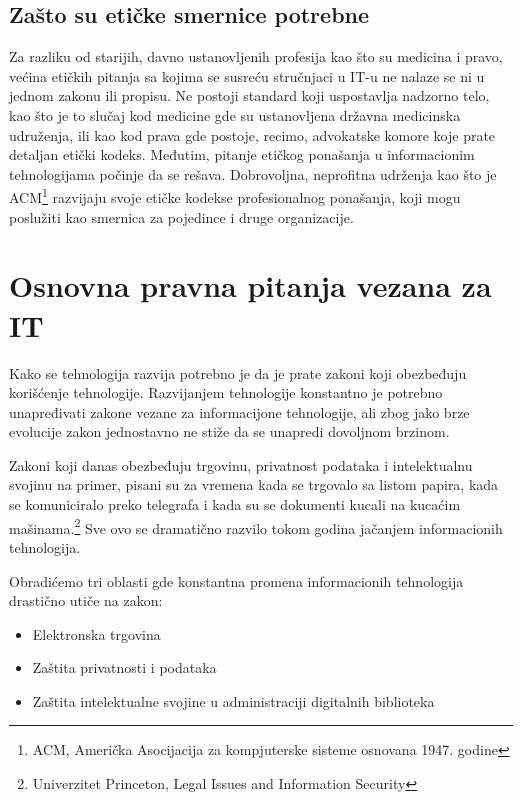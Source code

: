 \documentclass[a4paper]{article}
\begin{document}
{\subsection{Zašto su etičke smernice potrebne}

Za razliku od starijih, davno ustanovljenih profesija kao što su medicina i pravo, većina etičkih pitanja sa kojima se susreću stručnjaci u IT-u ne nalaze se ni u jednom zakonu ili propisu. Ne postoji standard koji uspostavlja nadzorno telo, kao što je to slučaj kod medicine gde su ustanovljena državna medicinska udruženja, ili kao kod prava gde postoje, recimo, advokatske komore koje prate detaljan etički kodeks. 
Međutim, pitanje etičkog ponašanja u informacionim tehnologijama počinje da se rešava. Dobrovoljna, neprofitna udrženja kao što je ACM\footnote{ACM, Američka Asocijacija za kompjuterske sisteme osnovana 1947. godine} razvijaju svoje etičke kodekse profesionalnog ponašanja, koji mogu poslužiti kao smernica za pojedince i druge organizacije.

\section{Osnovna pravna pitanja vezana za IT}

Kako se tehnologija razvija potrebno je da je prate zakoni koji obezbeđuju korišćenje tehnologije. Razvijanjem tehnologije konstantno je potrebno unapređivati zakone vezane za informacijone tehnologije, ali zbog jako brze evolucije zakon jednostavno ne stiže da se unapredi dovoljnom brzinom.

Zakoni koji danas obezbeđuju trgovinu, privatnost podataka i intelektualnu svojinu na primer, pisani su za vremena kada se trgovalo sa listom papira, kada se komuniciralo preko telegrafa i kada su se dokumenti kucali na kucaćim mašinama.\footnote{Univerzitet Princeton, Legal Issues and Information Security} Sve ovo se dramatično razvilo tokom godina jačanjem informacionih tehnologija.

Obradićemo tri oblasti gde konstantna promena informacionih tehnologija drastično utiče na zakon:

\begin{itemize}
\item{Elektronska trgovina}
\item{Zaštita privatnosti i podataka}
\item{Zaštita intelektualne svojine u administraciji digitalnih biblioteka}
\end{itemize}

}
\end{document}
